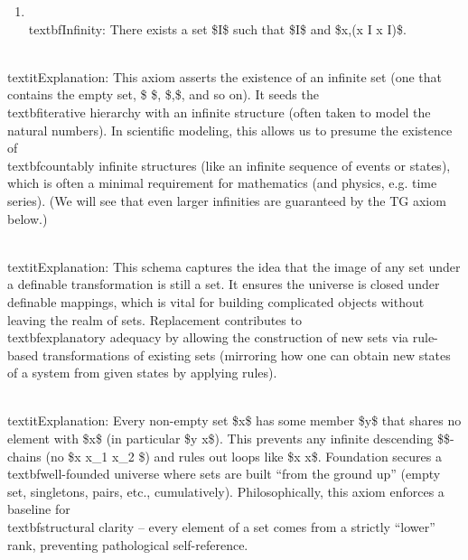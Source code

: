 \documentclass[11pt]{article}
\begin{document}
\begin{enumerate}
  \item \\textbf{Infinity:} There exists a set \$I\$ such that \$\varnothing \in I\$ and \$\forall x,(x \in I \rightarrow x  \in I)\$.
\end{enumerate}
   \\textit{Explanation:} This axiom asserts the existence of an infinite set (one that contains the empty set, \${ \emptyset }\$, \${\emptyset,{\emptyset}}\$, and so on). It seeds the \\textbf{iterative hierarchy} with an infinite structure (often taken to model the natural numbers). In scientific modeling, this allows us to presume the existence of \\textbf{countably infinite} structures (like an infinite sequence of events or states), which is often a minimal requirement for mathematics (and physics, e.g. time series). (We will see that even larger infinities are guaranteed by the TG axiom below.)

\begin{enumerate}
  \item \\textbf{Replacement (Schema):} If \$F\$ is a definable class function and \$X\$ is a set, then \$F\[X] = {F(x) : x \in X}\$ is also a set.
\end{enumerate}
   \\textit{Explanation:} This schema captures the idea that the image of any set under a definable transformation is still a set. It ensures the universe is closed under definable mappings, which is vital for building complicated objects without leaving the realm of sets. Replacement contributes to \\textbf{explanatory adequacy} by allowing the construction of new sets via rule-based transformations of existing sets (mirroring how one can obtain new states of a system from given states by applying rules).

\begin{enumerate}
  \item \\textbf{Foundation (Regularity):} \$\forall x,\[x \neq \varnothing \rightarrow \exists y \in x:; x \cap y = \varnothing]\$.
\end{enumerate}
   \\textit{Explanation:} Every non-empty set \$x\$ has some member \$y\$ that shares no element with \$x\$ (in particular \$y \notin x\$). This prevents any infinite descending \$\in\$-chains (no \$x \ni x\_1 \ni x\_2 \ni \cdots\$) and rules out loops like \$x \in x\$. Foundation secures a \\textbf{well-founded} universe where sets are built “from the ground up” (empty set, singletons, pairs, etc., cumulatively). Philosophically, this axiom enforces a baseline for \\textbf{structural clarity} – every element of a set comes from a strictly “lower” rank, preventing pathological self-reference.
\end{document}
